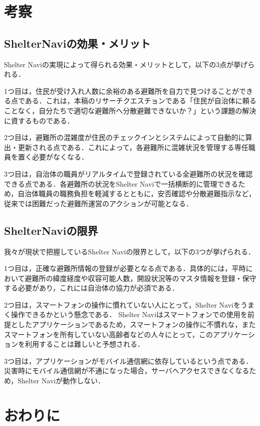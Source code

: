 \documentclass[technicalreport,dvipdfmx]{ieicej}
\begin{document}
\section{考察}
\subsection{ShelterNaviの効果・メリット}
Shelter Naviの実現によって得られる効果・メリットとして，以下の3点が挙げられる．

1つ目は，住民が受け入れ人数に余裕のある避難所を自力で見つけることができる点である．これは，本稿のリサーチクエスチョンである「住民が自治体に頼ることなく，自分たちで適切な避難所へ分散避難できないか？」という課題の解決に資するものである．

2つ目は，避難所の混雑度が住民のチェックインとシステムによって自動的に算出・更新される点である．これによって，各避難所に混雑状況を管理する専任職員を置く必要がなくなる．

3つ目は，自治体の職員がリアルタイムで登録されている全避難所の状況を確認できる点である．各避難所の状況をShelter Naviで一括横断的に管理できるため，自治体職員の職務負担を軽減するとともに，安否確認や分散避難指示など，従来では困難だった避難所運営のアクションが可能となる．

\subsection{ShelterNaviの限界}
我々が現状で把握しているShelter Naviの限界として，以下の3つが挙げられる．

1つ目は，正確な避難所情報の登録が必要となる点である．具体的には，平時において避難所の緯度経度や収容可能人数，開設状況等のマスタ情報を登録・保守する必要があり，これには自治体の協力が必須である．

2つ目は，スマートフォンの操作に慣れていない人にとって，Shelter Naviをうまく操作できるかという懸念である． Shelter Naviはスマートフォンでの使用を前提としたアプリケーションであるため，スマートフォンの操作に不慣れな，またスマートフォンを所有していない高齢者などの人々にとって，このアプリケーションを利用することは難しいと予想される．

3つ目は，アプリケーションがモバイル通信網に依存しているという点である．災害時にモバイル通信網が不通になった場合，サーバへアクセスできなくなるため，Shelter Naviが動作しない．

\section{おわりに}
\end{document}
